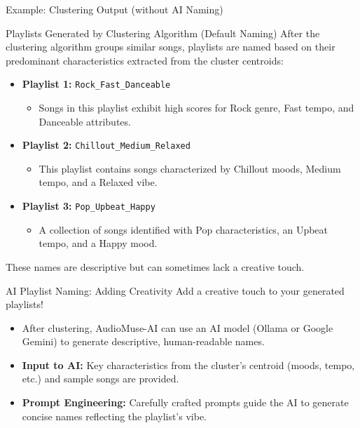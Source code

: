 \documentclass{beamer}
\begin{document}
\begin{frame}{Example: Clustering Output (without AI Naming)}
    \begin{exampleblock}{Playlists Generated by Clustering Algorithm (Default Naming)}
    \small
    After the clustering algorithm groups similar songs, playlists are named based on their predominant characteristics extracted from the cluster centroids:
    \begin{itemize}
        \item \textbf{Playlist 1:} \texttt{Rock\_Fast\_Danceable}
            \begin{itemize}
                \item Songs in this playlist exhibit high scores for Rock genre, Fast tempo, and Danceable attributes.
            \end{itemize}
        \item \textbf{Playlist 2:} \texttt{Chillout\_Medium\_Relaxed}
            \begin{itemize}
                \item This playlist contains songs characterized by Chillout moods, Medium tempo, and a Relaxed vibe.
            \end{itemize}
        \item \textbf{Playlist 3:} \texttt{Pop\_Upbeat\_Happy}
            \begin{itemize}
                \item A collection of songs identified with Pop characteristics, an Upbeat tempo, and a Happy mood.
            \end{itemize}
    \end{itemize}
    These names are descriptive but can sometimes lack a creative touch.
    \end{exampleblock}
\end{frame}

\begin{frame}{AI Playlist Naming: Adding Creativity}
    Add a creative touch to your generated playlists!
    \begin{itemize}
        \item After clustering, AudioMuse-AI can use an AI model (Ollama or Google Gemini) to generate descriptive, human-readable names.
        \item \textbf{Input to AI:} Key characteristics from the cluster's centroid (moods, tempo, etc.) and sample songs are provided.
        \item \textbf{Prompt Engineering:} Carefully crafted prompts guide the AI to generate concise names reflecting the playlist's vibe.
    \end{itemize}
\end{frame}
\end{document}
